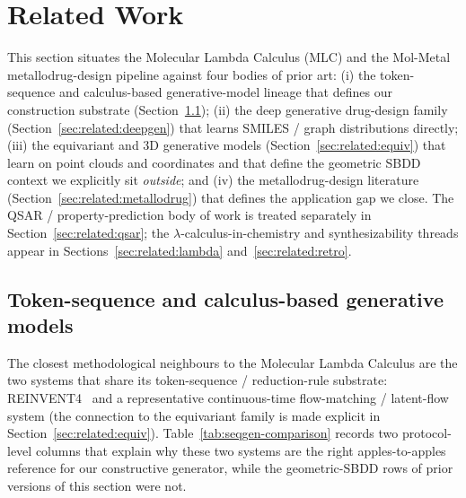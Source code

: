 
\section{Related Work}
\label{sec:related}

This section situates the Molecular Lambda Calculus (MLC) and the
Mol-Metal metallodrug-design pipeline against four bodies of prior art:
(i) the token-sequence and calculus-based generative-model lineage that
defines our construction substrate (Section~\ref{sec:related:seqgen});
(ii) the deep generative drug-design family
(Section~\ref{sec:related:deepgen}) that learns SMILES / graph
distributions directly; (iii) the equivariant and 3D generative models
(Section~\ref{sec:related:equiv}) that learn on point clouds and
coordinates and that define the geometric SBDD context we explicitly
sit \emph{outside}; and (iv) the metallodrug-design literature
(Section~\ref{sec:related:metallodrug}) that defines the application
gap we close. The QSAR / property-prediction body of work is treated
separately in Section~\ref{sec:related:qsar}; the
$\lambda$-calculus-in-chemistry and synthesizability threads appear in
Sections~\ref{sec:related:lambda} and~\ref{sec:related:retro}.

\subsection{Token-sequence and calculus-based generative models}
\label{sec:related:seqgen}

The closest methodological neighbours to the Molecular Lambda Calculus
are the two systems that share its token-sequence / reduction-rule
substrate: REINVENT4~\cite{footnote:reinvent4} and a representative
continuous-time flow-matching / latent-flow system (the connection to
the equivariant family is made explicit in
Section~\ref{sec:related:equiv}). Table~\ref{tab:seqgen-comparison}
records two protocol-level columns that explain why these two systems
are the right apples-to-apples reference for our constructive
generator, while the geometric-SBDD rows of prior versions of this
section were not.

